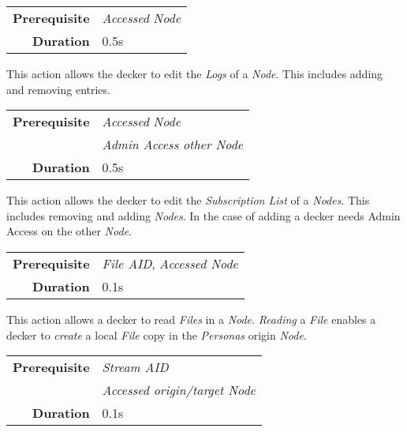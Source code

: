 \label{par:edit logs}


\begin{tabular}{rl}
    \textbf{Prerequisite} & \emph{Accessed} \emph{Node} \\
    \textbf{Duration}     & 0.5s                        \\
\end{tabular}

\hfill

This action allows the decker to edit the \emph{Logs} of a \emph{Node}. This
includes adding and removing entries.

\label{par:edit subscriptions}


\begin{tabular}{rl}
    \textbf{Prerequisite} & \emph{Accessed} \emph{Node}    \\
                          & \emph{Admin Access other Node} \\
    \textbf{Duration}     & 0.5s                           \\
\end{tabular}

\hfill

This action allows the decker to edit the \emph{Subscription List} of a \emph{Nodes}.
This includes removing and adding \emph{Nodes}. In the case of adding
a decker needs Admin Access on the other \emph{Node}.

\label{par:read file}

\begin{tabular}{rl}
    \textbf{Prerequisite} & \emph{File AID}, \emph{Accessed Node} \\
    \textbf{Duration}     & 0.1s                                  \\
\end{tabular}

\hfill

This action allows a decker to read \emph{Files} in a \emph{Node}. \emph{Reading}
a \emph{File} enables a decker to \emph{create} a local \emph{File} copy in the
\emph{Personas} origin \emph{Node}.

\label{par:read stream}

\begin{tabular}{rl}
    \textbf{Prerequisite} & \emph{Stream AID}                  \\
                          & \emph{Accessed origin/target Node} \\
    \textbf{Duration}     & 0.1s                               \\
\end{tabular}


